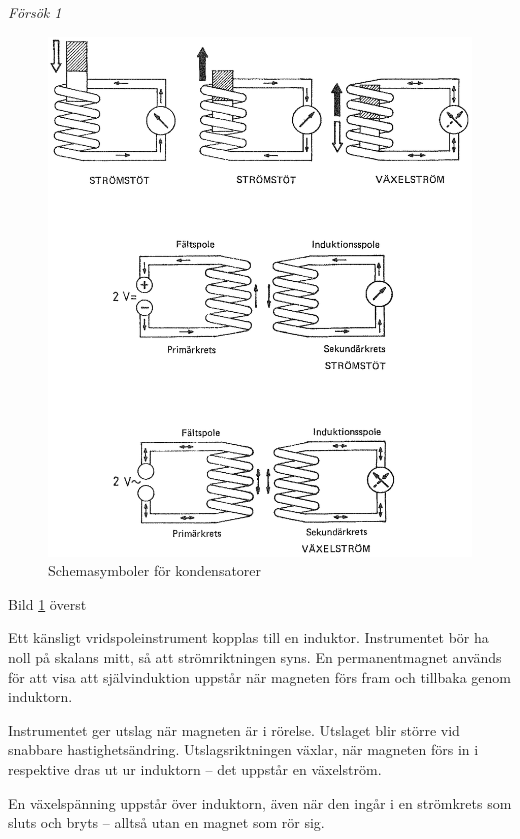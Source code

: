 \emph{Försök 1}

\begin{figure}
\includegraphics[width=\textwidth]{images/cropped_pdfs/bild_2_2-03.pdf}
\caption{Schemasymboler för kondensatorer}
\label{fig:BildII2-3}
\end{figure}

Bild \ref{fig:BildII2-3} överst

Ett känsligt vridspoleinstrument kopplas till en induktor. Instrumentet bör ha
noll på skalans mitt, så att strömriktningen syns. En permanentmagnet används
för att visa att självinduktion uppstår när magneten förs fram och tillbaka
genom induktorn.

Instrumentet ger utslag när magneten är i rörelse. Utslaget blir större vid
snabbare hastighetsändring. Utslagsriktningen växlar, när magneten förs in i
respektive dras ut ur induktorn -- det uppstår en växelström.

En växelspänning uppstår över induktorn, även när den ingår i en strömkrets som
sluts och bryts -- alltså utan en magnet som rör sig.

